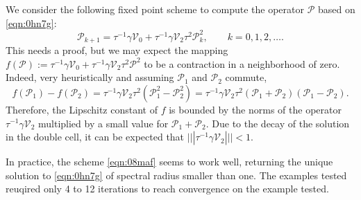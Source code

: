 \documentclass[a4paper,10pt,reqno]{amsart}
\begin{document}
\medskip    

We consider the following fixed point scheme to compute the operator $\mathcal{P}$
based on \cref{eqn:0hn7g}:  
\begin{equation}
\label{eqn:08maf}
\mathcal{P}_{k+1}=\tau^{-1}\gamma \mathcal{V}_0+\tau^{-1}\gamma
\mathcal{V}_2\tau^{2}\mathcal{P}_k^{2}, \qquad k=0,1,2,\dots.
\end{equation}
{\color{blue} This needs a proof,} but we may expect the mapping
$f(\mathcal{P}):=\tau^{-1}\gamma \mathcal{V}_0+\tau^{-1}\gamma
\mathcal{V}_2\tau^{2}\mathcal{P}^{2}$ to be a contraction in a neighborhood of zero.
Indeed,     very heuristically and assuming $\mathcal{P}_1$ and $\mathcal{P}_2$
commute, 
\[
f(\mathcal{P}_1)-f(\mathcal{P}_2)=\tau^{-1}\gamma
\mathcal{V}_2\tau^{2}(\mathcal{P}_1^{2}-\mathcal{P}_2^{2}) = \tau^{-1}\gamma
\mathcal{V}_2\tau^{2}(\mathcal{P}_1+\mathcal{P}_2)(\mathcal{P}_1-\mathcal{P}_2).
\] 
Therefore, the Lipschitz constant of $f$ is bounded by the norms of the operator
$\tau^{-1}\gamma\mathcal{V}_2$ multiplied by a small value for $\mathcal{P}_1+\mathcal{P}_2$. Due to
the decay of the solution in the double cell, it can be expected that $|||\tau^{-1}\gamma
\mathcal{V}_2|||<1$.
    
\medskip    

In practice, the scheme \cref{eqn:08maf} seems to work well, returning the unique
solution to \cref{eqn:0hn7g} of spectral radius smaller than one. The examples tested   
reuqired only 4 to 12 
iterations to reach convergence on the example tested. 
    
\bigskip    
\end{document}
